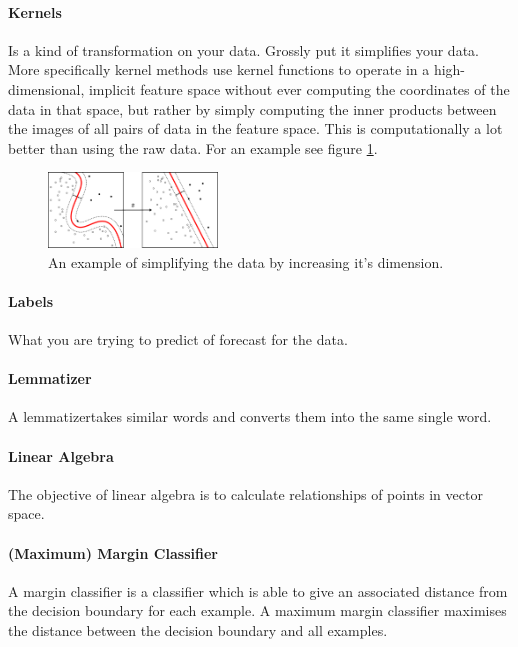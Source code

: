 \paragraph{Kernels} 
Is a kind of transformation on your data. Grossly put it simplifies your data. More specifically kernel methods use kernel functions to operate in a high-dimensional, implicit feature space without ever computing the coordinates of the data in that space, but rather by simply computing the inner products between the images of all pairs of data in the feature space. This is computationally a lot better than using the raw data. For an example see figure \ref{fig:kernelmethods}.
\begin{figure}
\centering
\includegraphics[width=0.4\textwidth]{images/kernelmethod.png}
\caption{\label{fig:kernelmethods} An example of simplifying the data by increasing it's dimension.}
\end{figure}

\paragraph{Labels} 
What you are trying to predict of forecast for the data.

\paragraph{Lemmatizer}
A lemmatizertakes similar words and converts them into the same single word.

\paragraph{Linear Algebra} 
The objective of linear algebra is to calculate relationships of points in vector space. 

\paragraph{(Maximum) Margin Classifier}
A margin classifier is a classifier which is able to give an associated distance from the decision boundary for each example. A maximum margin classifier maximises the distance between the decision boundary and all examples.

